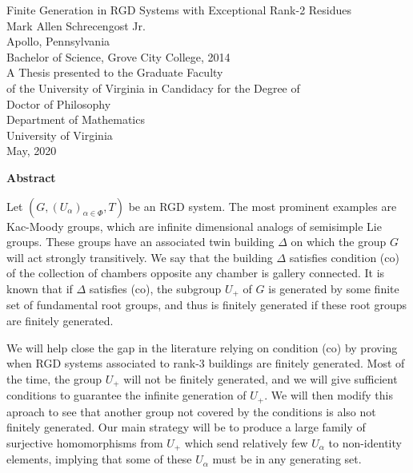 \documentclass[12 pt,oneside]{book}
\begin{document}
\frontmatter
\begin{center}
	\thispagestyle{empty}
	\vspace*{1 in}
	Finite Generation in RGD Systems with Exceptional Rank-2 Residues\\[1 in]
	Mark Allen Schrecengost Jr.\\
	Apollo, Pennsylvania\\[0.5 in]
	Bachelor of Science, Grove City College, 2014\\[1.5 in]
	A Thesis presented to the Graduate Faculty\\
	of the University of Virginia in Candidacy for the Degree of\\
	Doctor of Philosophy\\[0.5 in]
	Department of Mathematics\\[0.5 in]
	University of Virginia\\
	May, 2020
\end{center}
\vfill
\hfill{}
\clearpage
\thispagestyle{empty}
\begin{center}
	\textbf{Abstract}
\end{center}
Let $(G,(U_\alpha)_{\alpha\in \Phi},T)$ be an RGD system. The most prominent examples are Kac-Moody groups, which are infinite dimensional analogs of semisimple Lie groups. These groups have an associated twin building $\Delta$ on which the group $G$ will act strongly transitively. We say that the building $\Delta$ satisfies condition (co) of the collection of chambers opposite any chamber is gallery connected. It is known that if $\Delta$ satisfies (co), the subgroup $U_+$ of $G$ is generated by some finite set of fundamental root groups, and thus is finitely generated if these root groups are finitely generated.

We will help close the gap in the literature relying on condition (co) by proving when RGD systems associated to rank-3 buildings are finitely generated. Most of the time, the group $U_+$ will not be finitely generated, and we will give sufficient conditions to guarantee the infinite generation of $U_+.$ We will then modify this aproach to see that another group not covered by the conditions is also not finitely generated. Our main strategy will be to produce a large family of surjective homomorphisms from $U_+$ which send relatively few $U_\alpha$ to non-identity elements, implying that some of these $U_\alpha$ must be in any generating set.
\end{document}
